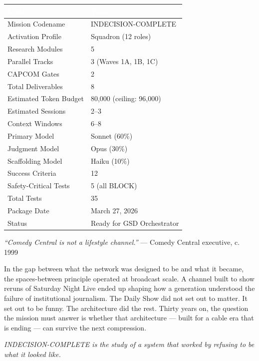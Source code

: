 \documentclass[11pt,letterpaper]{article}
\newcommand{\tableheader}[1]{\textbf{\sffamily\textcolor{white}{#1}}}
\begin{document}
\begin{center}
\begin{tabularx}{\textwidth}{L{5cm}X}
\toprule
{}
\tableheader{Metric} & \tableheader{Value} \\
\midrule
Mission Codename & INDECISION-COMPLETE \\
Activation Profile & Squadron (12 roles) \\
Research Modules & 5 \\
Parallel Tracks & 3 (Waves 1A, 1B, 1C) \\
CAPCOM Gates & 2 \\
Total Deliverables & 8 \\
Estimated Token Budget & 80,000 (ceiling: 96,000) \\
Estimated Sessions & 2--3 \\
Context Windows & 6--8 \\
Primary Model & Sonnet (60\%) \\
Judgment Model & Opus (30\%) \\
Scaffolding Model & Haiku (10\%) \\
Success Criteria & 12 \\
Safety-Critical Tests & 5 (all BLOCK) \\
Total Tests & 35 \\
Package Date & March 27, 2026 \\
Status & Ready for GSD Orchestrator \\
\bottomrule
\end{tabularx}
\end{center}

\vspace{2em}

\begin{quotebox}
\textit{``Comedy Central is not a lifestyle channel.''} --- Comedy Central executive, c. 1999

\vspace{0.8em}
\noindent In the gap between what the network was designed to be and what it became, the spaces-between principle operated at broadcast scale. A channel built to show reruns of Saturday Night Live ended up shaping how a generation understood the failure of institutional journalism. The Daily Show did not set out to matter. It set out to be funny. The architecture did the rest. Thirty years on, the question the mission must answer is whether that architecture --- built for a cable era that is ending --- can survive the next compression.

\vspace{0.6em}
\noindent \textit{INDECISION-COMPLETE is the study of a system that worked by refusing to be what it looked like.}
\end{quotebox}
\end{document}
